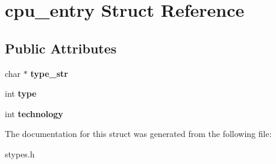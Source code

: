 \hypertarget{structcpu__entry}{
\section{cpu\_\-entry Struct Reference}
\label{structcpu__entry}
}
\subsection*{Public Attributes}
\begin{DoxyCompactItemize}
\item 
\hypertarget{structcpu__entry_abd35b264b163d64830ef9f5daae102a8}{
char $\ast$ {\bfseries type\_\-str}}
\label{structcpu__entry_abd35b264b163d64830ef9f5daae102a8}

\item 
\hypertarget{structcpu__entry_a0dee5cc2b42478b805b7fa17ce14b010}{
int {\bfseries type}}
\label{structcpu__entry_a0dee5cc2b42478b805b7fa17ce14b010}

\item 
\hypertarget{structcpu__entry_a3d3710e3547ce9b64d919bda6feb0a57}{
int {\bfseries technology}}
\label{structcpu__entry_a3d3710e3547ce9b64d919bda6feb0a57}

\end{DoxyCompactItemize}


The documentation for this struct was generated from the following file:\begin{DoxyCompactItemize}
\item 
stypes.h\end{DoxyCompactItemize}
